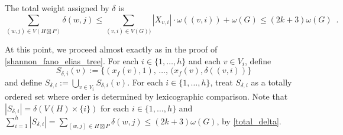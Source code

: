 \documentclass{patmorin}
\renewcommand{\le}{\leqslant}
\begin{document}
  The total weight assigned by $\delta$ is
  \begin{equation}
  \sum_{(w,j)\in V(H\boxtimes P)} \delta(w,j)
  \le \sum_{(v,i)\in V(G))}|X_{v,i}|\cdot\omega((v,i)) + \omega(G)
  \le
  (2k+3)\omega(G) \enspace . \label{total_delta}
  \end{equation}

  At this point, we proceed almost exactly as in the proof of \cref{shannon_fano_elias_tree}.
  For each $i\in\{1,\ldots,h\}$ and each $v\in V_i$, define
  \[
     S_{\delta,i}(v):=\{(x_f(v),1),\,\ldots,\, (x_f(v),\delta((v,i))\}
  \]
  and define $S_{\delta,i}:=\bigcup_{v\in V_i}S_{\delta,i}(v)$.  For each $i\in\{1,\ldots,h\}$, treat $S_{\delta,i}$ as a totally ordered set where order is determined by lexicographic comparison.  Note that $|S_{\delta,i}|=\delta(V(H)\times\{i\})$ for each $i\in\{1,\ldots,h\}$ and $\sum_{i=1}^h |S_{\delta,i}|=\sum_{(w,j)\in H\boxtimes P}\delta(w,j)\le (2k+3)\omega(G)$, by \cref{total_delta}.
\end{document}
